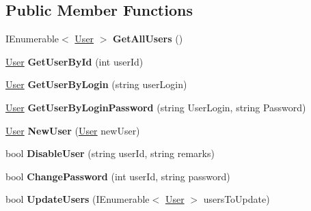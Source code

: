 \subsection*{Public Member Functions}
\begin{DoxyCompactItemize}
\item 
\mbox{\label{interface_h_k_supply_1_1_services_1_1_interfaces_1_1_i_user_ab18e28f31a3a14a63df31f17991aeb43}} 
I\+Enumerable$<$ \mbox{\hyperlink{class_h_k_supply_1_1_models_1_1_user}{User}} $>$ {\bfseries Get\+All\+Users} ()
\item 
\mbox{\label{interface_h_k_supply_1_1_services_1_1_interfaces_1_1_i_user_a49a1d525d5ab93f26cbe66b1f22abe1a}} 
\mbox{\hyperlink{class_h_k_supply_1_1_models_1_1_user}{User}} {\bfseries Get\+User\+By\+Id} (int user\+Id)
\item 
\mbox{\label{interface_h_k_supply_1_1_services_1_1_interfaces_1_1_i_user_afe1079dfae7c77234d9120d3e51fd35b}} 
\mbox{\hyperlink{class_h_k_supply_1_1_models_1_1_user}{User}} {\bfseries Get\+User\+By\+Login} (string user\+Login)
\item 
\mbox{\label{interface_h_k_supply_1_1_services_1_1_interfaces_1_1_i_user_a814c835f9375a134f01ad961e27d7314}} 
\mbox{\hyperlink{class_h_k_supply_1_1_models_1_1_user}{User}} {\bfseries Get\+User\+By\+Login\+Password} (string User\+Login, string Password)
\item 
\mbox{\label{interface_h_k_supply_1_1_services_1_1_interfaces_1_1_i_user_a0f68a7ca2668977e45d199ea21522a98}} 
\mbox{\hyperlink{class_h_k_supply_1_1_models_1_1_user}{User}} {\bfseries New\+User} (\mbox{\hyperlink{class_h_k_supply_1_1_models_1_1_user}{User}} new\+User)
\item 
\mbox{\label{interface_h_k_supply_1_1_services_1_1_interfaces_1_1_i_user_af241b1a787265f454b2d5b33a8514ff0}} 
bool {\bfseries Disable\+User} (string user\+Id, string remarks)
\item 
\mbox{\label{interface_h_k_supply_1_1_services_1_1_interfaces_1_1_i_user_a437f1837393b7a306de3fecdce176c97}} 
bool {\bfseries Change\+Password} (int user\+Id, string password)
\item 
\mbox{\label{interface_h_k_supply_1_1_services_1_1_interfaces_1_1_i_user_a61282883d17b0cf41a07a93e9bd49db7}} 
bool {\bfseries Update\+Users} (I\+Enumerable$<$ \mbox{\hyperlink{class_h_k_supply_1_1_models_1_1_user}{User}} $>$ users\+To\+Update)
\end{DoxyCompactItemize}


